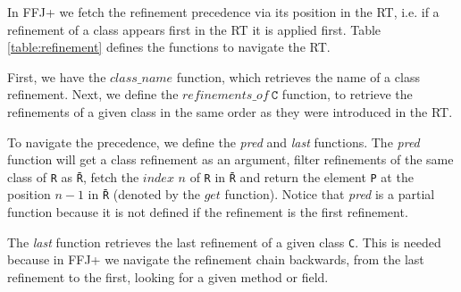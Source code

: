 In \ac{FFJ+} we fetch the refinement precedence via its position in the \textsf{RT}, i.e.
if a refinement of a class appears first in the \textsf{RT} it is applied first. 
Table \ref{table:refinement} defines the functions to navigate the \textsf{RT}.
    
First, we have the $class\_name$ function, which retrieves the name of a class refinement.
Next, we define the $refinements\_of~\texttt{C}$ function, to retrieve the refinements of 
a given class in the same order as they were introduced in the \textsf{RT}.

To navigate the precedence, we define the \textit{pred} and \textit{last} functions.
The \textit{pred} function will get a class refinement as an argument,
filter refinements of the same class of \texttt{R} as \texttt{\=R}, fetch the $index$ $n$ of \texttt{R} in \texttt{\=R} 
and return the element \texttt{P} at the position $n-1$ in \texttt{\=R} (denoted by the $get$ function). Notice that \textit{pred} is a partial function because it is not defined if the refinement is the first refinement.

The \textit{last} function retrieves the last refinement of a given class \texttt{C}.
This is needed because in \ac{FFJ+} we navigate the refinement chain backwards, from the last refinement
to the first, looking for a given method or field. 


